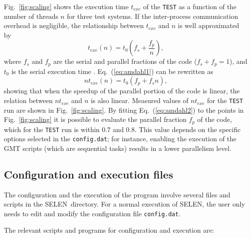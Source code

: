\documentclass[11pt,fleqn,a4paper,titlepage]{article}
\newcommand\selen{\textsf{SELEN~}}
\newcommand\selens{\textsf{SELEN}}
\begin{document}
{Fig.~\ref{fig:scaling} 
shows the execution time $t_{exe}$ of the \texttt{TEST} as a function of the number of threads $n$ for three test systems.  If the inter-process communication overhead is negligible, the relationship between $t_{exe}$ and $n$ is well approximated by
\begin{equation}\label{eq:amdahl1}
t_{exe}(n) = t_0 \left( f_s + \frac{f_p}{n} \right), 
\end{equation}
where $f_s$ and $f_p$ are the serial and parallel fractions of the code ($f_s+f_p=1$), and $t_0$ is the serial execution time \citep{Amdahl_1967}.  Eq.~(\ref{eq:amdahl1}) can be rewritten as
\begin{equation}\label{eq:amdahl2}
n t_{exe}(n) = t_0 \left( f_p + f_s n \right), 
\end{equation}
showing that when the speedup of the parallel portion of the code is linear, the relation between $nt_{exe}$ and $n$ is also linear. Measured values of $nt_{exe}$ for the \texttt{TEST} run are shown in Fig.~\ref{fig:scaling}. By fitting Eq.~(\ref{eq:amdahl2}) to the points in Fig.~\ref{fig:scaling} it is possible to evaluate the parallel fraction $f_p$ of the code, which for the \texttt{TEST} run is within $0.7$ and $0.8$. This value depends on the specific options selected in the \texttt{config.dat}; for instance, enabling the execution of the GMT scripts (which are sequential tasks) results in a lower parallelism level.




\subsection{Configuration and execution files}
The configuration and the execution of the program involve several files and scripts 
in the \selen directory. For a normal execution of \selens,
the user only needs to edit and modify the configuration file {\texttt{config.dat}}. 

\vspace{0.3cm}
\noindent The relevant scripts and programs for configuration and execution are: 

}
\end{document}
